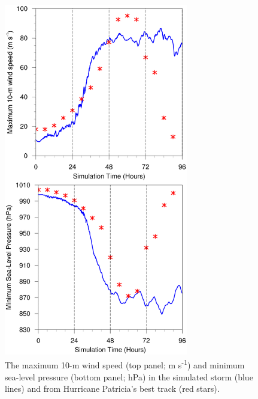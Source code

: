 \documentclass{ametsoc}
\begin{document}
\begin{figure}[ht]
\centerline{\includegraphics[width=19pc]{figures/vmax+pmin.png}}
\caption{The maximum 10-m wind speed (top panel; m s\textsuperscript{-1}) and minimum sea-level pressure (bottom panel; hPa) in the simulated storm (blue lines) and from Hurricane Patricia's best track (red stars).}
\label{fig:vmax+pmin}
\end{figure}
\end{document}
